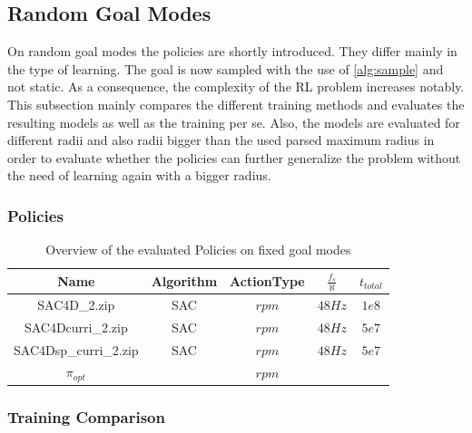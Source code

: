 


\newpage

\subsection{Random Goal Modes}
On random goal modes the policies are shortly introduced. 
They differ mainly in the type of learning. 
The goal is now sampled with the use of \cref{alg:sample} and not static. 
As a consequence, the complexity of the RL problem increases notably. 
This subsection mainly compares the different training methods and evaluates the resulting models as well as the training per se. 
Also, the models are evaluated for different radii and also radii bigger than the used parsed maximum radius in order to evaluate whether the policies 
can further generalize the problem without the need of learning again with a bigger radius.

\subsubsection{Policies}

\newpage

\begin{longtable}{|c|c|c|c|c|}
	\caption{Overview of the evaluated Policies on random goal modes}\label{tab:pi2}\\
	
	\hline
	Name & Algorithm & ActionType & $\frac{f_s}{\aleph}$ & $t_{total}$ \\
	\hline
	\endfirsthead
	\caption[]{Overview of the evaluated Policies on fixed goal modes}
	\endhead
	SAC4D\_2.zip & SAC & $rpm$ & $48Hz$ & $1e8$\\
	\hline
	SAC4Dcurri\_2.zip & SAC & $rpm$ & $48Hz$ & $5e7$\\
	\hline
	SAC4Dsp\_curri\_2.zip & SAC & $rpm$ & $48Hz$ & $5e7$\\
	\hline
	$\pi_{opt}$ & & $rpm$ & & \\
	\hline
\end{longtable}

\newpage

\subsubsection{Training Comparison}

